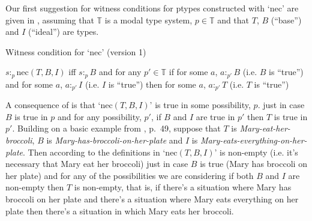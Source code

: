 Our first suggestion for witness conditions
for ptypes constructed with `nec' are given in
\nexteg{}, assuming that $\mathbb{T}$ is a modal type system,
$p\in\mathbb{T}$ and that $T$, $B$ (``base'') and $I$ (``ideal'') are types.
\begin{ex}
  Witness condition for `nec' (version 1)

  $s:_p\text{nec}(T,B,I)$ iff $s:_pB$ and for any $p'\in\mathbb{T}$ if
  for some $a$, $a:_{p'}B$ (i.e. $B$ is ``true'') and for some $a$,
  $a:_{p'}I$ (i.e. $I$ is ``true'') then for some $a$, $a:_{p'}T$
  (i.e. $T$ is ``true'')
 
 

  

  
  
    
 
\label{ex:necTBI1}   
\end{ex}
A consequence of \preveg{} is that `$\text{nec}(T,B,I)$' is true in some
possibility, $p$. just in case $B$ is true in $p$ and for any possibility, $p'$, if $B$ and $I$ are
true in $p'$ then $T$ is true in $p'$.
Building on a basic example from \citealp{Portner2009}, p.~49, suppose
that $T$ is \textit{Mary-eat-her-broccoli}, $B$ is
\textit{Mary-has-broccoli-on-her-plate} and $I$ is
\textit{Mary-eats-everything-on-her-plate}.  Then according to the
definitions in \preveg{} `$\text{nec}(T,B,I)$' is non-empty (i.e. it's
necessary that Mary eat her broccoli) just in case $B$ is true (Mary
has broccoli on her plate) and
for any of the possibilities we are considering if both $B$ and  $I$ are
non-empty then $T$ is non-empty, that is, if there's a situation where
Mary has broccoli on her plate and there's a situation where Mary eats everything on her plate
then there's a situation in which Mary eats her broccoli.

